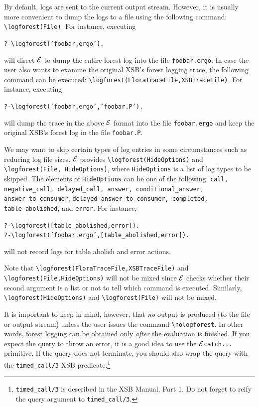 \documentclass[11pt]{article}
\newcommand{\ERGO}{\mbox{\ensuremath{\cal{E}}\smaller{{\sc{RGO}}}}\xspace}
\newcommand{\FLSYSTEM}{\ERGO}
\newcommand{\ergoext}{ergo\xspace}
\newcommand{\bs}{\textbackslash}
\begin{document}
By default, logs are sent to the current output stream. However, it is
usually more convenient
to dump the logs to a file using the following command:
{\tt \bs{}logforest(File)}. For instance, executing
\begin{alltt}
   ?- \bs{}logforest('foobar.\ergoext').
\end{alltt}
will direct \FLSYSTEM to dump the entire forest log into the file {\tt foobar.\ergoext}.
In case the user also wants to examine the original XSB's forest
logging trace, the following command can be executed: 
{\tt \bs{}logforest(FloraTraceFile,XSBTraceFile)}. For instance, executing
\begin{alltt}
   ?- \bs{}logforest('foobar.\ergoext', 'foobar.P').
\end{alltt}
will dump the trace in the above \FLSYSTEM format into the file {\tt foobar.\ergoext}
and keep the original XSB's forest log in the file {\tt foobar.P}. 

We may want to skip certain types of log entries in some circumstances such
as reducing log file sizes. \FLSYSTEM provides {\tt \bs{}logforest(HideOptions)} and 
{\tt \bs{}logforest(File, HideOptions)}, where {\tt HideOptions} is a list of log
types to be skipped.
The elements of {\tt HideOptions} can be one of the following:
\texttt{call,
  negative\_call, delayed\_call,  answer, conditional\_answer},
  \texttt{answer\_to\_consumer}, \texttt{delayed\_answer\_to\_consumer, completed,
  table\_abolished}, and {\tt error}. For instance,  
\begin{alltt}
   ?- \bs{}logforest([table_abolished, error]).
   ?- \bs{}logforest('foobar.\ergoext', [table_abolished, error]).
\end{alltt}
will not record logs for table abolish and error actions. 

Note that {\tt \bs{}logforest(FloraTraceFile,XSBTraceFile)} and 
{\tt \bs{}logforest(File,HideOptions)} will not be mixed since \FLSYSTEM
checks whether their second argument is a list or not to tell
which command is executed. 
Similarly, {\tt \bs{}logforest(HideOptions)} and {\tt \bs{}logforest(File)}
will not be mixed.

It is important to keep in mind, however, that \emph{no} output
is produced (to the file or output stream) unless the user issues the command
{\tt \bs{}nologforest}. In other words, forest logging can be obtained only
\emph{after} the evaluation is finished. 
If you expect the query to throw an error, it is a good idea to use the
\FLSYSTEM \texttt{catch{...}} primitive. If the query does not terminate,
you should also wrap the query with the \texttt{timed\_call/3} XSB predicate.\footnote{
  \texttt{timed\_call/3} is described in the XSB Manual, Part 1. Do not
  forget to reify the query argument to  \texttt{timed\_call/3}.
  }
\end{document}

